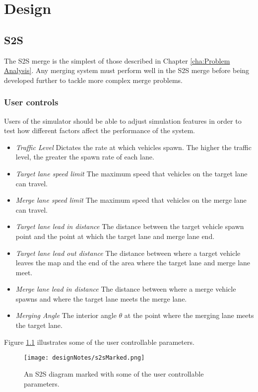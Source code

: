 \chapter{Design}
\label{cha:Design}

\section{S2S}{}
\label{sec:S2S}
The S2S merge is the simplest of those described in Chapter \ref{cha:Problem Analysis}. Any merging system must perform well in the S2S merge before being developed further to tackle more complex merge problems.

\subsection{User controls}
\label{subsec:User controls}
Users of the simulator should be able to adjust simulation features in order to test how different factors affect the performance of the system.

\begin{itemize}
\item \textit{Traffic Level}
Dictates the rate at which vehicles spawn. The higher the traffic level, the greater the spawn rate of each lane.
\item \textit{Target lane speed limit}
The maximum speed that vehicles on the target lane can travel.
\item \textit{Merge lane speed limit}
The maximum speed that vehicles on the merge lane can travel.
\item \textit{Target lane lead in distance}
The distance between the target vehicle spawn point and the point at which the target lane and merge lane end.
\item \textit{Target lane lead out distance}
The distance between where a target vehicle leaves the map and the end of the area where the target lane and merge lane meet.
\item \textit{Merge lane lead in distance}
The distance between where a merge vehicle spawns and where the target lane meets the merge lane.
\item \textit{Merging Angle}
The interior angle $\theta$ at the point where the merging lane meets the target lane.
\end{itemize}

Figure \ref{fig:s2sMarked} illustrates some of the user controllable parameters.

\begin{figure}[htb]
\texttt{[image: designNotes/s2sMarked.png]}
\caption{An S2S diagram marked with some of the user controllable parameters.}
\label{fig:s2sMarked}
\end{figure}


